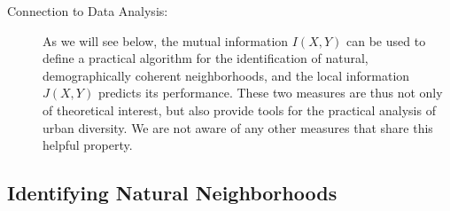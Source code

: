 \begin{description}
		\item[Connection to Data Analysis:] As we will see below, the mutual information $I(X,Y)$ can be used to define a practical algorithm for the identification of natural, demographically coherent neighborhoods, and the local information $J(X,Y)$ predicts its performance. These two measures are thus not only of theoretical interest, but also provide tools for the practical analysis of urban diversity. We are not aware of any other measures that share this helpful property. 
	\end{description}

\subsection*{Identifying Natural Neighborhoods} 
	
